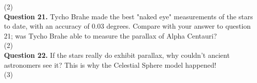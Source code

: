 \documentclass[11pt]{article}
\begin{document}
\vspace{1.5cm}
(2) \hrulefill\\

\textbf{Question 21.} Tycho Brahe made the best "naked eye" measurements of the stars to date, with an accuracy of 0.03 degrees. Compare with your answer to question 21; was Tycho Brahe able to measure the parallax of Alpha Centauri?\\

\vspace{1.5cm}
(2) \hrulefill\\

\textbf{Question 22.} If the stars really do exhibit parallax, why couldn't ancient astronomers see it? This is why the Celestial Sphere model happened!\\

\vspace{1.5cm}
(3) \hrulefill\\
\end{document}
